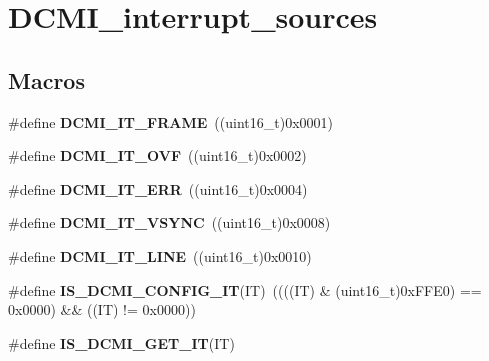 \hypertarget{group___d_c_m_i__interrupt__sources}{\section{D\-C\-M\-I\-\_\-interrupt\-\_\-sources}
\label{group___d_c_m_i__interrupt__sources}
}
\subsection*{Macros}
\begin{DoxyCompactItemize}
\item 
\hypertarget{group___d_c_m_i__interrupt__sources_gadaec1a969aa5f1f993157c3b7930ee15}{\#define {\bfseries D\-C\-M\-I\-\_\-\-I\-T\-\_\-\-F\-R\-A\-M\-E}~((uint16\-\_\-t)0x0001)}\label{group___d_c_m_i__interrupt__sources_gadaec1a969aa5f1f993157c3b7930ee15}

\item 
\hypertarget{group___d_c_m_i__interrupt__sources_ga5afbb2e1a8b64d9e042da18d8304667e}{\#define {\bfseries D\-C\-M\-I\-\_\-\-I\-T\-\_\-\-O\-V\-F}~((uint16\-\_\-t)0x0002)}\label{group___d_c_m_i__interrupt__sources_ga5afbb2e1a8b64d9e042da18d8304667e}

\item 
\hypertarget{group___d_c_m_i__interrupt__sources_gaef8a30c349bbe77a26052613053c0201}{\#define {\bfseries D\-C\-M\-I\-\_\-\-I\-T\-\_\-\-E\-R\-R}~((uint16\-\_\-t)0x0004)}\label{group___d_c_m_i__interrupt__sources_gaef8a30c349bbe77a26052613053c0201}

\item 
\hypertarget{group___d_c_m_i__interrupt__sources_gac60620cc8cfcff9063bb141f75bdedf6}{\#define {\bfseries D\-C\-M\-I\-\_\-\-I\-T\-\_\-\-V\-S\-Y\-N\-C}~((uint16\-\_\-t)0x0008)}\label{group___d_c_m_i__interrupt__sources_gac60620cc8cfcff9063bb141f75bdedf6}

\item 
\hypertarget{group___d_c_m_i__interrupt__sources_gab31edbfaa9359494beda9324bbe3a70d}{\#define {\bfseries D\-C\-M\-I\-\_\-\-I\-T\-\_\-\-L\-I\-N\-E}~((uint16\-\_\-t)0x0010)}\label{group___d_c_m_i__interrupt__sources_gab31edbfaa9359494beda9324bbe3a70d}

\item 
\hypertarget{group___d_c_m_i__interrupt__sources_ga73bb15913a02e43fa9e4519f16d8566b}{\#define {\bfseries I\-S\-\_\-\-D\-C\-M\-I\-\_\-\-C\-O\-N\-F\-I\-G\-\_\-\-I\-T}(I\-T)~((((I\-T) \& (uint16\-\_\-t)0x\-F\-F\-E0) == 0x0000) \&\& ((\-I\-T) != 0x0000))}\label{group___d_c_m_i__interrupt__sources_ga73bb15913a02e43fa9e4519f16d8566b}

\item 
\#define {\bfseries I\-S\-\_\-\-D\-C\-M\-I\-\_\-\-G\-E\-T\-\_\-\-I\-T}(I\-T)
\end{DoxyCompactItemize}


